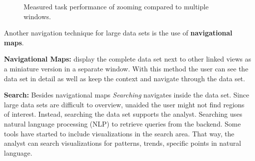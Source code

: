 \begin{figure}[H]
    \centering
    \caption[Comparison of Zoom and Multiple Linked Views]{Measured task performance of zooming compared to multiple windows.  \cite{Ware2012}}
    \label{fig:zoomVsMultiWindow}
\end{figure}

Another navigation technique for large data sets is the use of \textbf{navigational maps}.\par
\textbf{Navigational Maps:} display the complete data set next to other linked views as a miniature version in a separate window. With this method the user can see the data set in detail as well as keep the context and navigate through the data set.\par
\textbf{Search: }\label{search} Besides navigational maps \textit{Searching} navigates inside the data set. Since large data sets are difficult to overview, unaided the user might not find regions of interest. Instead, searching the data set supports the analyst. Searching uses natural language processing (NLP) to retrieve queries from the backend. Some tools have started to include visualizations in the search area. That way, the analyst can search visualizations for patterns, trends, specific points in natural language. 
\par

